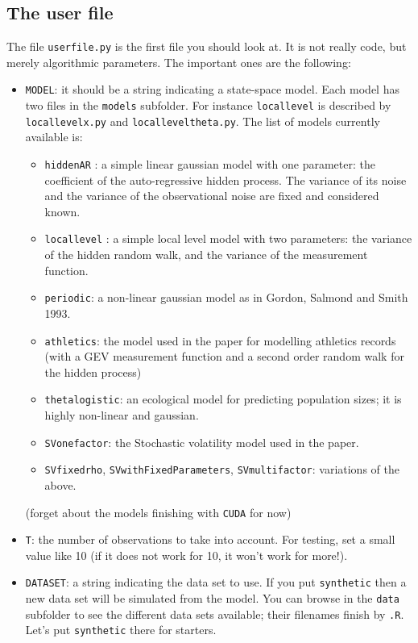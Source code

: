 \documentclass[a4paper,10pt]{paper}
\begin{document}
\subsection{The user file}

The file \texttt{userfile.py} is the first file you should look at. It is not really code, but merely 
algorithmic parameters. The important ones are the following:
\begin{itemize}
 \item \texttt{MODEL}: it should be a string indicating a state-space model. Each model has two files in the \texttt{models} subfolder. For instance
\texttt{locallevel} is described by \texttt{locallevelx.py} and \texttt{localleveltheta.py}. The list of models currently available is:
\begin{itemize}
 \item \texttt{hiddenAR} : a simple linear gaussian model with one parameter: the coefficient of the auto-regressive hidden process. The variance of its noise
and the variance of the observational noise are fixed and considered known.
 \item \texttt{locallevel} : a simple local level model with two parameters: the variance of the hidden random walk, and the variance of the measurement function.
 \item \texttt{periodic}: a non-linear gaussian model as in Gordon, Salmond and Smith 1993.
 \item \texttt{athletics}: the model used in the paper for modelling athletics records (with a GEV measurement function and a second order random walk for the hidden process)
 \item \texttt{thetalogistic}: an ecological model for predicting population sizes; it is highly non-linear and gaussian.
 \item \texttt{SVonefactor}: the Stochastic volatility model used in the paper.
 \item \texttt{SVfixedrho}, \texttt{SVwithFixedParameters}, \texttt{SVmultifactor}: variations of the above.
\end{itemize}
(forget about the models finishing with \texttt{CUDA} for now)
\item \texttt{T}: the number of observations to take into account. For testing, set a small value like 10 (if it does not work for 10, it won't work for more!).
\item \texttt{DATASET}: a string indicating the data set to use. If you put \texttt{synthetic} then a new data set will be simulated from the model.
You can browse in the \texttt{data} subfolder to see the different data sets available; their filenames finish by \texttt{.R}. Let's put \texttt{synthetic} there for starters.

\end{itemize}
\end{document}
